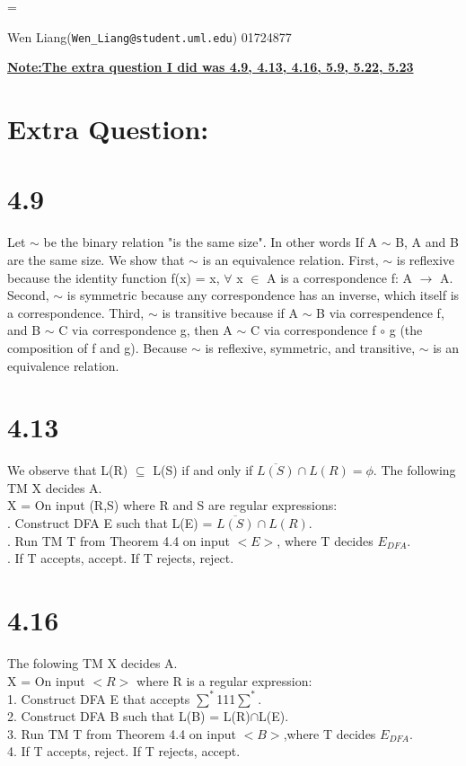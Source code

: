 \documentclass{scrartcl}
\begin{document}
\hfuzz=\maxdimen
{}
\begin{center}
Wen Liang(\texttt{Wen\_Liang@student.uml.edu}) 01724877

\end{center}


\textbf{\underline{Note:The extra question I did was 4.9, 4.13, 4.16, 5.9, 5.22, 5.23}}

\section*{Extra Question:}
\section*{4.9}
Let 
$\sim$ be the binary relation "is the same size". In other words If A 
$\sim$ B, A and B are the same size. We show that 
$\sim$ is an equivalence relation. First, 
$\sim$ is reflexive because the identity function f(x) = x, $\forall$ x $\in$ A is a correspondence f: A $\to$ A. Second, $\sim$ is symmetric because any correspondence has an inverse, which itself is a correspondence. Third, $\sim$ is transitive because if A $\sim$ B via correspendence f, and B $\sim$ C via correspondence g, then A $\sim$ C via correspondence f $\circ$ g (the composition of f and g). Because $\sim$ is reflexive, symmetric, and transitive, $\sim$ is an equivalence relation.

\section*{4.13}
We observe that L(R) $\subseteq$ L(S) if and only if $\overline{L(S)} \cap L(R) = \phi$. The following TM X decides A.\\
X = On input (R,S) where R and S are regular expressions:\\
. Construct DFA E such that L(E) = $\overline{L(S)} \cap L(R)$.\\
. Run TM T from Theorem 4.4 on input $<E>$, where T decides $E_{DFA}$.\\
. If T accepts, accept. If T rejects, reject.

\section*{4.16}
The folowing TM X decides A.\\
X = On input $<R>$ where R is a regular expression:\\
1. Construct DFA E that accepts $\sum^*$111$\sum^*$.\\
2. Construct DFA B such that L(B) = L(R)$\cap$L(E).\\
3. Run TM T from Theorem 4.4 on input $<B>$,where T decides $E_{DFA}$.\\
4. If T accepts, reject. If T rejects, accept.
\end{document}
